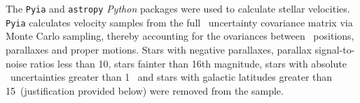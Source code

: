 The {\tt Pyia} \citep{price-whelan_2018} and {\tt astropy} \citep{astropy2013,
astropy2018} {\it Python} packages were used to calculate stellar velocities.
{\tt Pyia} calculates velocity samples from the full \gaia\ uncertainty
covariance matrix via Monte Carlo sampling, thereby accounting for the
ovariances between \gaia\ positions, parallaxes and proper motions.
Stars with negative parallaxes, parallax signal-to-noise ratios less than 10,
stars fainter than 16th magnitude, stars with absolute \vb\ uncertainties
greater than 1 \kms\, and stars with galactic latitudes greater than
15\degrees\ (justification provided below) were removed from the sample.



